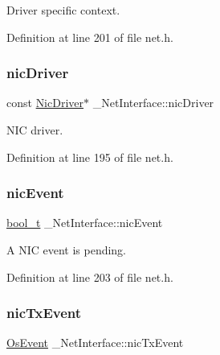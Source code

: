 Driver specific context. 



Definition at line 201 of file net.\+h.

\mbox{\label{struct__NetInterface_ab9164c30bb4d952d2420681b967aa165}} 
\subsubsection{\texorpdfstring{nic\+Driver}{nicDriver}}
{\footnotesize\ttfamily const \hyperlink{structNicDriver}{Nic\+Driver}$\ast$ \+\_\+\+Net\+Interface\+::nic\+Driver}



N\+IC driver. 



Definition at line 195 of file net.\+h.

\mbox{\label{struct__NetInterface_a594b38fa99d44e8c8ba0a697848ac3ac}} 
\subsubsection{\texorpdfstring{nic\+Event}{nicEvent}}
{\footnotesize\ttfamily \hyperlink{compiler__port_8h_a812d16e5494522586b3784e55d479912}{bool\+\_\+t} \+\_\+\+Net\+Interface\+::nic\+Event}



A N\+IC event is pending. 



Definition at line 203 of file net.\+h.

\mbox{\label{struct__NetInterface_aa46ad2e464a331ea931fa829af394c8b}} 
\subsubsection{\texorpdfstring{nic\+Tx\+Event}{nicTxEvent}}
{\footnotesize\ttfamily \hyperlink{structOsEvent}{Os\+Event} \+\_\+\+Net\+Interface\+::nic\+Tx\+Event}



